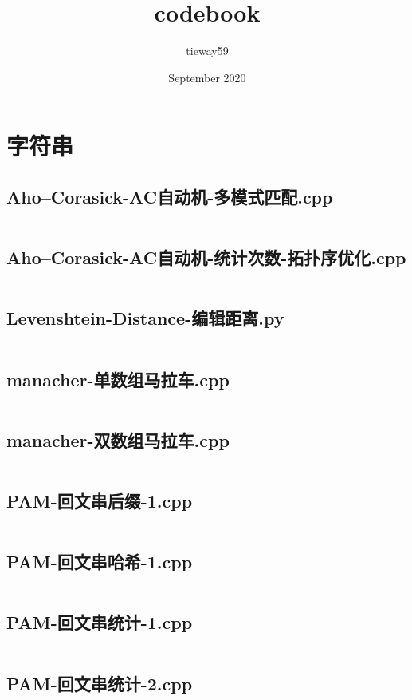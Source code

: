\documentclass[a4paper,landscape,twocolumn]{article} %
\title{codebook}
\author{tieway59}
\date{September 2020}
\begin{document}

\begingroup
\let\onecolumn\twocolumn
\tableofcontents
\endgroup

\newpage

\section{字符串}
\subsection{Aho–Corasick-AC自动机-多模式匹配.cpp}
\inputminted{c++}{./codes/000}
\subsection{Aho–Corasick-AC自动机-统计次数-拓扑序优化.cpp}
\inputminted{c++}{./codes/001}
\subsection{Levenshtein-Distance-编辑距离.py}
\inputminted{python}{./codes/002}
\subsection{manacher-单数组马拉车.cpp}
\inputminted{c++}{./codes/003}
\subsection{manacher-双数组马拉车.cpp}
\inputminted{c++}{./codes/004}
\subsection{PAM-回文串后缀-1.cpp}
\inputminted{c++}{./codes/005}
\subsection{PAM-回文串哈希-1.cpp}
\inputminted{c++}{./codes/006}
\subsection{PAM-回文串统计-1.cpp}
\inputminted{c++}{./codes/007}
\subsection{PAM-回文串统计-2.cpp}
\inputminted{c++}{./codes/008}
\end{document}
